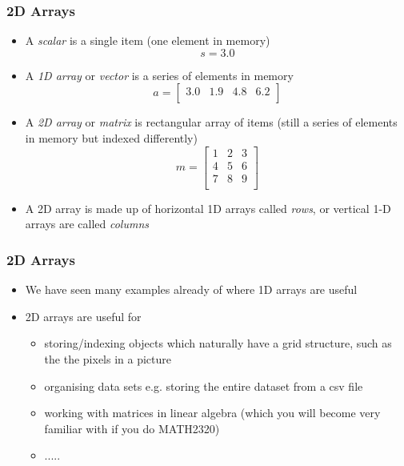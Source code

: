 \documentclass[english,14pt]{beamer}
\begin{document}
\begin{frame}[fragile]
\frametitle{2D Arrays}
	\begin{itemize}
		\item A \textit{scalar} is a single item \small{(one element in memory)}
\[
s = 3.0   
\]

		\item A  \textit{1D array} or \textit{vector} is a series of elements in memory
\[
a  = \left[ 
\begin{array}{cccc}
   3.0 & 1.9 & 4.8 & 6.2 \\
 \end{array} \right]    
\]
		\item A \textit{2D array} or \textit{matrix} is rectangular array of items \small{(still a series of elements in memory but indexed differently)}
\[		
m = \left[ 
\begin{array}{ccc}
     1 & 2 & 3   \\
     4 & 5 & 6   \\
     7 & 8 & 9  \\     
\end{array} \right]  
\]		
 \item A 2D array is made up of horizontal 1D arrays called \textit{rows}, or vertical 1-D arrays are called \textit{columns}  
	\end{itemize}
\end{frame}


\begin{frame}[fragile]
\frametitle{2D Arrays}
	\begin{itemize}
		\item We have seen many examples already of where 1D arrays are useful
		\item 2D arrays are useful for 
		    \begin{itemize} 
		        \item storing/indexing objects which naturally have a grid structure, such as the the pixels in a picture
		        \item organising data sets e.g. storing the entire dataset from a csv file
		        \item working with matrices in linear algebra (which you will become very familiar with if you do MATH2320)
		        \item .....
		    \end{itemize}
	\end{itemize}
\end{frame}
\end{document}

